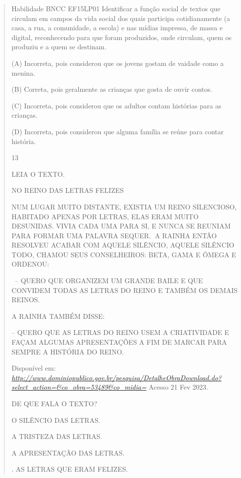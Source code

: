 \begin{escola}
{\begin{verse}
{{Habilidade BNCC EF15LP01 Identificar a função social de textos que
circulam em campos da vida social dos quais participa cotidianamente (a
casa, a rua, a comunidade, a escola) e nas mídias impressa, de massa e
digital, reconhecendo para que foram produzidos, onde circulam, quem os
produziu e a quem se destinam.

(A) Incorreta, pois considerou que os jovens gostam de vaidade como a
menina.

(B) Correta, pois geralmente as crianças que gosta de ouvir contos.

(C) Incorreta, pois considerou que os adultos contam histórias para as
crianças.

(D) Incorreta, pois considerou que alguma família se reúne para contar
história.

\num{13}

LEIA O TEXTO.

NO REINO DAS LETRAS FELIZES

NUM LUGAR MUITO DISTANTE, EXISTIA UM REINO SILENCIOSO, HABITADO APENAS
POR LETRAS, ELAS ERAM MUITO DESUNIDAS. VIVIA CADA UMA PARA SI, E NUNCA
SE REUNIAM PARA FORMAR UMA PALAVRA SEQUER.\textbf{~}A RAINHA ENTÃO
RESOLVEU ACABAR COM AQUELE SILÊNCIO, AQUELE SILÊNCIO TODO, CHAMOU SEUS
CONSELHEIROS: BETA, GAMA E ÔMEGA E ORDENOU:

~-- QUERO QUE ORGANIZEM UM GRANDE BAILE E QUE CONVIDEM TODAS AS LETRAS
DO REINO E TAMBÉM OS DEMAIS REINOS.

A RAINHA TAMBÉM DISSE:

-- QUERO QUE AS LETRAS DO REINO USEM A CRIATIVIDADE E FAÇAM ALGUMAS
APRESENTAÇÕES A FIM DE MARCAR PARA SEMPRE A HISTÓRIA DO REINO.

Disponível em:
\href{http://www.dominiopublico.gov.br/pesquisa/DetalheObraDownload.do?select_action=\&co_obra=53489\&co_midia=}{\emph{http://www.dominiopublico.gov.br/pesquisa/DetalheObraDownload.do?select\_action=\&co\_obra=53489\&co\_midia=}}
Acesso 21 Fev 2023.

DE QUE FALA O TEXTO?

\begin{escolha}
\item O SILÊNCIO DAS LETRAS.

\item A TRISTEZA DAS LETRAS.

\item A APRESENTAÇÃO DAS LETRAS.

\item. AS LETRAS QUE ERAM FELIZES.
\end{escolha}

}}
\end{verse}}
\end{escola}
